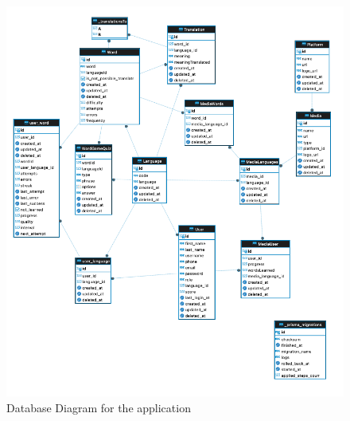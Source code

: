 \documentclass[12pt]{article}
\begin{document}
\begin{figure}[!h]
  \centering
  \caption{
  Database Diagram for the application
  }
  \label{fig:database_diagram}
  \includegraphics[width=1\textwidth]{assets/23.png}
\end{figure}
\end{document}
